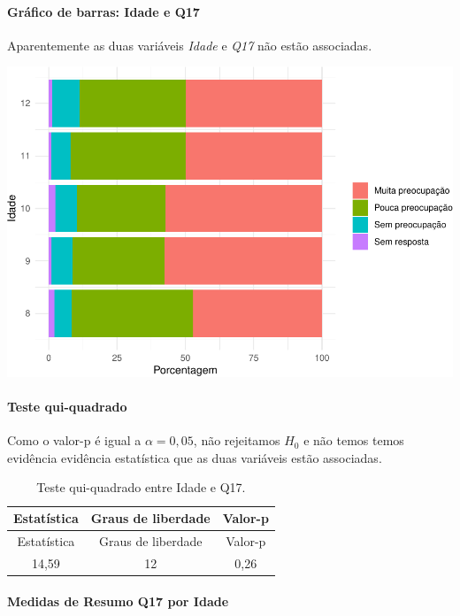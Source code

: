 \documentclass[]{article}
\let\oldparagraph\paragraph
\renewcommand{\paragraph}[1]{\oldparagraph{#1}\mbox{}}
\begin{document}
\hypertarget{gruxe1fico-de-barras-idade-e-q17}{%
\paragraph{Gráfico de barras: Idade e Q17}\label{gruxe1fico-de-barras-idade-e-q17}}

Aparentemente as duas variáveis \emph{Idade} e \emph{Q17} não estão associadas.

\begin{center}\includegraphics[width=0.75\linewidth]{relatorio_files/figure-latex/unnamed-chunk-196-1} \end{center}

\hypertarget{teste-qui-quadrado-20}{%
\paragraph{Teste qui-quadrado}\label{teste-qui-quadrado-20}}

Como o valor-p é igual a \(\alpha=0,05\), não rejeitamos \(H_0\) e não temos temos evidência evidência estatística que as duas variáveis estão associadas.

\begin{longtable}[]{@{}ccc@{}}
\caption{\label{tab:unnamed-chunk-197}Teste qui-quadrado entre Idade e Q17.}\tabularnewline
\toprule
Estatística & Graus de liberdade & Valor-p\tabularnewline
\midrule
\endfirsthead
\toprule
Estatística & Graus de liberdade & Valor-p\tabularnewline
\midrule
\endhead
14,59 & 12 & 0,26\tabularnewline
\bottomrule
\end{longtable}

\cleardoublepage

\hypertarget{medidas-de-resumo-q17-por-idade}{%
\paragraph{Medidas de Resumo Q17 por Idade}\label{medidas-de-resumo-q17-por-idade}}
\end{document}
